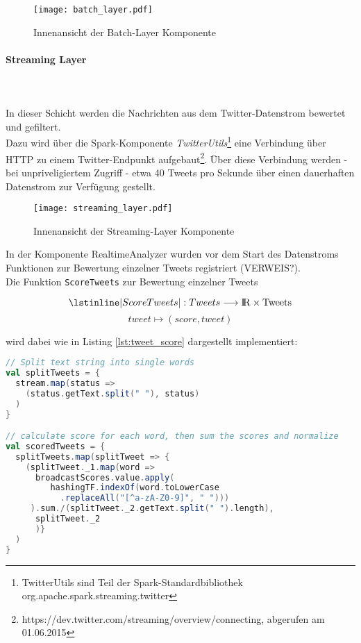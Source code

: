 \begin{figure}[ht!]
	\centering
  \texttt{[image: batch\_layer.pdf]}
	\caption{Innenansicht der Batch-Layer Komponente}
	\label{figure:demo_app_batchlayer}
\end{figure}

\paragraph{Streaming Layer}\\
\\

In dieser Schicht werden die Nachrichten aus dem Twitter-Datenstrom bewertet und gefiltert.\\

Dazu wird über die Spark-Komponente \textit{TwitterUtils}\footnote{TwitterUtils sind Teil der Spark-Standardbibliothek org.apache.spark.streaming.twitter} eine Verbindung über HTTP zu einem Twitter-Endpunkt aufgebaut\footnote{https://dev.twitter.com/streaming/overview/connecting, abgerufen am 01.06.2015}. Über diese Verbindung werden - bei unpriveligiertem Zugriff - etwa 40 Tweets pro Sekunde über einen dauerhaften Datenstrom zur Verfügung gestellt.\\

\begin{figure}[ht!]
	\centering
  \texttt{[image: streaming\_layer.pdf]}
	\caption{Innenansicht der Streaming-Layer Komponente}
	\label{figure:demo_app_streaminglayer}
\end{figure}

In der Komponente RealtimeAnalyzer wurden vor dem Start des Datenstroms Funktionen zur Bewertung einzelner Tweets registriert (VERWEIS?).\\

Die Funktion \lstinline|ScoreTweets| zur Bewertung einzelner Tweets

\[\lstinline|ScoreTweets|: Tweets \longrightarrow \rm I\!R \times Tweets\]
\[tweet \mapsto (score, tweet)\]

wird dabei wie in Listing \ref{lst:tweet_score} dargestellt implementiert:

\begin{lstlisting}[language=Scala,caption={Bewertung von Tweets},label={lst:tweet_score}]
// Split text string into single words
val splitTweets = {
  stream.map(status =>
    (status.getText.split(" "), status)
  )
}

// calculate score for each word, then sum the scores and normalize
val scoredTweets = {
  splitTweets.map(splitTweet => {
    (splitTweet._1.map(word =>
      broadcastScores.value.apply(
         hashingTF.indexOf(word.toLowerCase
           .replaceAll("[^a-zA-Z0-9]", " ")))
     ).sum./(splitTweet._2.getText.split(" ").length),
      splitTweet._2
      )}
  )
}
\end{lstlisting}

